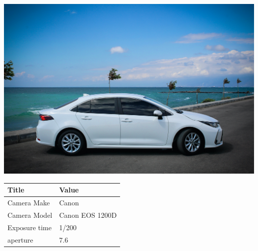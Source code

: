 \documentclass[twocolumn]{article}
\begin{document}
\begin{center}
\includegraphics[width=0.7\columnwidth]{Image10}
\newline
\newline
\newline
\newline
\newline

\begin{tabular}{| m{3cm} | m{3cm} |}
\hline



Title  &  Value   \\

\hline
Camera Make  & Canon   \\
\hline
Camera Model  & Canon EOS 1200D   \\
\hline
Exposure time  & 1/200  \\
\hline
aperture & 7.6 \\
\hline

\end{tabular}


\end{center}
\end{document}
